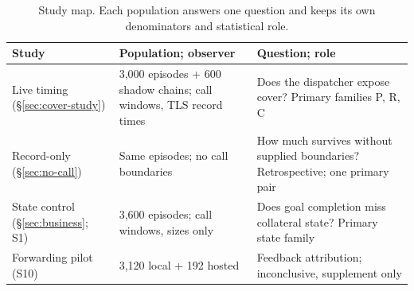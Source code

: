 \begin{table}[t]\centering\footnotesize
\caption{Study map. Each population answers one question and keeps its own denominators and statistical role.}\label{tab:study-map}
\setlength{\tabcolsep}{3pt}
\begin{tabularx}{\columnwidth}{@{}P{.2\columnwidth}P{.25\columnwidth}Y@{}}\toprule
Study & Population; observer & Question; role \\\midrule
Live timing (\S\ref{sec:cover-study}) & 3,000 episodes + 600 shadow chains; call windows, TLS record times & Does the dispatcher expose cover? Primary families P, R, C \\\addlinespace[2pt]
Record-only (\S\ref{sec:no-call}) & Same episodes; no call boundaries & How much survives without supplied boundaries? Retrospective; one primary pair \\\addlinespace[2pt]
State control (\S\ref{sec:business}; S1) & 3,600 episodes; call windows, sizes only & Does goal completion miss collateral state? Primary state family \\\addlinespace[2pt]
Forwarding pilot (S10) & 3,120 local + 192 hosted & Feedback attribution; inconclusive, supplement only \\\bottomrule
\end{tabularx}\end{table}
